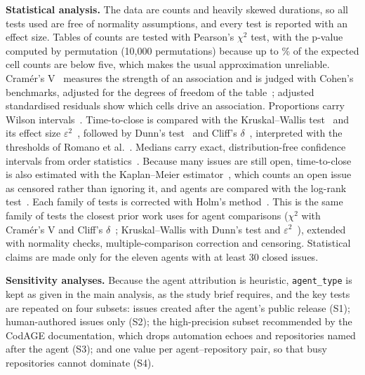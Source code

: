 \textbf{Statistical analysis.} The data are counts and heavily skewed durations, so all tests used are free of normality assumptions, and every test is reported with an effect size. Tables of counts are tested with Pearson's \(\chi^2\) test, with the p-value computed by permutation (10{,}000 permutations) because up to \MaxPctSparse\% of the expected cell counts are below five, which makes the usual approximation unreliable. Cram\'er's V~\cite{cramer1946methods} measures the strength of an association and is judged with Cohen's benchmarks, adjusted for the degrees of freedom of the table~\cite{cohen1988power}; adjusted standardised residuals show which cells drive an association. Proportions carry Wilson intervals~\cite{wilson1927probable}. Time-to-close is compared with the Kruskal--Wallis test~\cite{kruskal1952ranks} and its effect size \(\varepsilon^2\)~\cite{tomczak2014effect}, followed by Dunn's test~\cite{dunn1964multiple} and Cliff's \(\delta\)~\cite{cliff1993dominance}, interpreted with the thresholds of Romano et al.~\cite{romano2006appropriate}. Medians carry exact, distribution-free confidence intervals from order statistics~\cite{conover1999practical}. Because many issues are still open, time-to-close is also estimated with the Kaplan--Meier estimator~\cite{kaplan1958nonparametric}, which counts an open issue as censored rather than ignoring it, and agents are compared with the log-rank test~\cite{mantel1966logrank}. Each family of tests is corrected with Holm's method~\cite{holm1979simple}. This is the same family of tests the closest prior work uses for agent comparisons (\(\chi^2\) with Cram\'er's V and Cliff's \(\delta\)~\cite{selvanayagam2026aitoai}; Kruskal--Wallis with Dunn's test and \(\varepsilon^2\)~\cite{pham2026alignment}), extended with normality checks, multiple-comparison correction and censoring. Statistical claims are made only for the eleven agents with at least 30 closed issues.

\textbf{Sensitivity analyses.} Because the agent attribution is heuristic, \texttt{agent\_type} is kept as given in the main analysis, as the study brief requires, and the key tests are repeated on four subsets: issues created after the agent's public release (S1); human-authored issues only (S2); the high-precision subset recommended by the CodAGE documentation, which drops automation echoes and repositories named after the agent (S3); and one value per agent--repository pair, so that busy repositories cannot dominate (S4).
